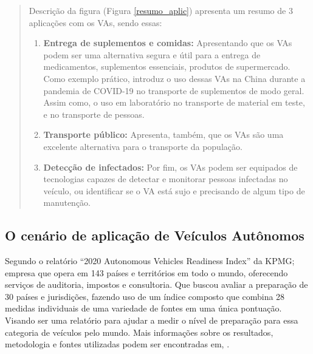 \begin{quote}

Descrição da figura (Figura \ref{resumo_aplic}) apresenta um resumo de 3 aplicações com os VAs, sendo essas:

\begin{enumerate}
 \item \textbf{Entrega de suplementos e comidas:} Apresentando que os VAs podem ser uma alternativa segura e útil para a entrega de medicamentos, suplementos essenciais, produtos de supermercado. Como exemplo prático, introduz o uso dessas VAs na China durante a pandemia de COVID-19 no transporte de suplementos de modo geral. Assim como, o uso em laboratório no transporte de material em teste, e no transporte de pessoas.

\item \textbf{Transporte público:} Apresenta, também, que os VAs são uma excelente alternativa para o transporte da população. 

\item \textbf{Detecção de infectados:} Por fim, os VAs podem ser equipados de tecnologias capazes de detectar e monitorar pessoas infectadas no veículo, ou identificar se o VA está sujo e precisando de algum tipo de manutenção. 

\end{enumerate}

\end{quote}

\subsection{O cenário de aplicação de Veículos Autônomos}
Segundo o relatório “2020 Autonomous Vehicles Readiness Index” da KPMG; empresa que opera em 143 países e territórios em todo o mundo, oferecendo serviços de auditoria, impostos e consultoria.
Que buscou avaliar a preparação de 30 países e jurisdições, fazendo uso de um índice composto que combina 28 medidas individuais de uma variedade de fontes em uma única pontuação. Visando ser uma relatório para ajudar a medir o nível de preparação para essa categoria de veículos pelo mundo. Mais informações sobre os resultados, metodologia e fontes utilizadas podem ser encontradas em, \cite{KPMG}.

